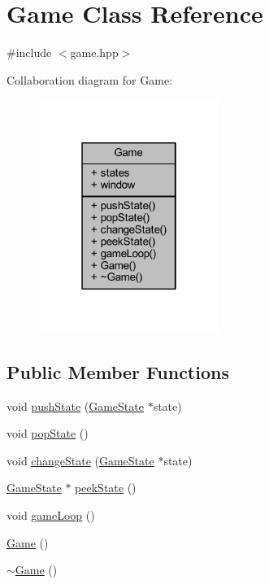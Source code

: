 \hypertarget{class_game}{}\section{Game Class Reference}
\label{class_game}


{\ttfamily \#include $<$game.\+hpp$>$}



Collaboration diagram for Game\+:
\nopagebreak
\begin{figure}[H]
\begin{center}
\leavevmode
\includegraphics[width=166pt]{class_game__coll__graph}
\end{center}
\end{figure}
\subsection*{Public Member Functions}
\begin{DoxyCompactItemize}
\item 
void \hyperlink{class_game_a5898f1edb6e3bc1700b2ffb1943bc609}{push\+State} (\hyperlink{class_game_state}{Game\+State} $\ast$state)
\item 
void \hyperlink{class_game_a4b33dd67adef59bebadba8a234282c88}{pop\+State} ()
\item 
void \hyperlink{class_game_a8683b16995200bd11d95efc372e6722a}{change\+State} (\hyperlink{class_game_state}{Game\+State} $\ast$state)
\item 
\hyperlink{class_game_state}{Game\+State} $\ast$ \hyperlink{class_game_a6cdc6cb374ab8e7d8ac9b280284b3793}{peek\+State} ()
\item 
void \hyperlink{class_game_aede5f46c8c7bbbaf8459eeec397a11e7}{game\+Loop} ()
\item 
\hyperlink{class_game_ad59df6562a58a614fda24622d3715b65}{Game} ()
\item 
\hyperlink{class_game_ae3d112ca6e0e55150d2fdbc704474530}{$\sim$\+Game} ()
\end{DoxyCompactItemize}
